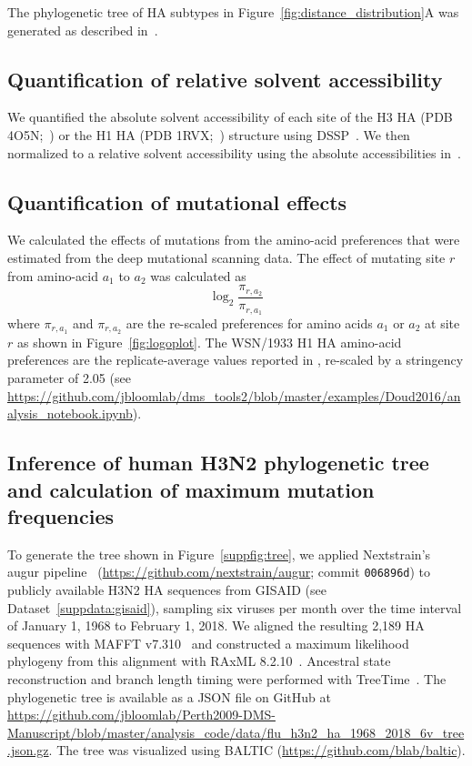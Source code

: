 \documentclass[9pt,twocolumn,twoside]{pnas-new-for-biorxiv}
\begin{document}
{The phylogenetic tree of HA subtypes in Figure~\ref{fig:distance_distribution}A was generated as described in~\cite{doud2018quantifying}.

\subsection*{Quantification of relative solvent accessibility}
We quantified the absolute solvent accessibility of each site of the H3 HA (PDB 4O5N;~\cite{lee2014receptor}) or the H1 HA (PDB 1RVX;~\cite{gamblin2004structure}) structure using DSSP~\cite{kabsch1983}.
We then normalized to a relative solvent accessibility using the absolute accessibilities in~\cite{tien2013}.

\subsection*{Quantification of mutational effects}
We calculated the effects of mutations from the amino-acid preferences that were estimated from the deep mutational scanning data.
The effect of mutating site $r$ from amino-acid $a_1$ to $a_2$ was calculated as
\begin{equation}
\log_2 \frac{\pi_{r,a_2}}{\pi_{r,a_1}}
\end{equation}
where $\pi_{r,a_1}$ and $\pi_{r,a_2}$ are the re-scaled preferences for amino acids $a_1$ or $a_2$ at site $r$ as shown in Figure~\ref{fig:logoplot}.
The WSN/1933 H1 HA amino-acid preferences are the replicate-average values reported in \cite{doud2016accurate}, re-scaled by a stringency parameter of 2.05 (see \url{https://github.com/jbloomlab/dms_tools2/blob/master/examples/Doud2016/analysis_notebook.ipynb}).

\subsection*{Inference of human H3N2 phylogenetic tree and calculation of maximum mutation frequencies}
To generate the tree shown in Figure~\ref{suppfig:tree}, we applied Nextstrain's augur pipeline~\cite{Hadfield224048} (\url{https://github.com/nextstrain/augur}; commit \texttt{006896d}) to publicly available H3N2 HA sequences from GISAID \cite{shu2017gisaid} (see Dataset~\ref{suppdata:gisaid}), sampling six viruses per month over the time interval of January 1, 1968 to February 1, 2018.
We aligned the resulting 2,189 HA sequences with MAFFT v7.310~\cite{katoh2013mafft} and constructed a maximum likelihood phylogeny from this alignment with RAxML 8.2.10~\cite{stamatakis2006raxml}.
Ancestral state reconstruction and branch length timing were performed with TreeTime~\cite{Sagulenko2018}.
The phylogenetic tree is available as a JSON file on GitHub at \url{https://github.com/jbloomlab/Perth2009-DMS-Manuscript/blob/master/analysis_code/data/flu_h3n2_ha_1968_2018_6v_tree.json.gz}.
The tree was visualized using BALTIC (\url{https://github.com/blab/baltic}).

}
\end{document}
